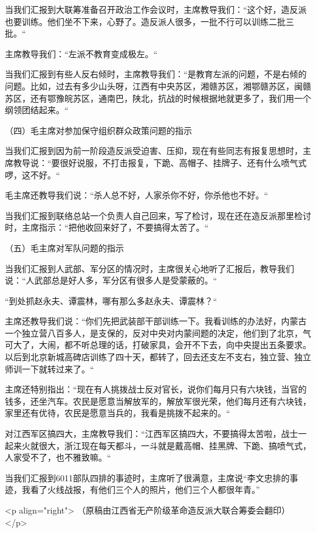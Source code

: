 当我们汇报到大联筹准备召开政治工作会议时，主席教导我们：“这个好，造反派也要训练。他们坐不下来，心野了。造反派人很多，一批不行可以训练二批三批。“

主席教导我们：“左派不教育变成极左。“

当我们汇报到有些人反右倾时，主席教导我们：“是教育左派的问题，不是右倾的问题。比如，过去有多少山头呀，江西有中央苏区，湘赣苏区，湘鄂赣苏区，闽赣苏区，还有鄂豫皖苏区，通南巴，陕北，抗战的时候根据地就更多了，我们用一个纲领团结起来。“

（四）毛主席对参加保守组织群众政策问题的指示

当我们汇报到因为前一阶段造反派受迫害、压抑，现在有些同志有报复思想时，主席教导说：“要很好说服，不打击报复，下跪、高帽子、挂牌子、还有什么喷气式啰，这不好。“

毛主席还教导我们说：“杀人总不好，人家杀你不好，你杀他也不好。“

当我们汇报到联络总站一个负责人自己回来，写了检讨，现在还在造反派那里检讨时，主席指示：“把他收回来好了，不要搞得太苦了。“

（五）毛主席对军队问题的指示

当我们汇报到人武部、军分区的情况时，主席很关心地听了汇报后，教导我们说：“人武部总是好人多，军分区有很多人是受蒙蔽的。“

“到处抓赵永夫、谭震林，哪有那么多赵永夫、谭震林？“

主席还教导我们说：“你们先把武装部干部训练一下。我看训练的办法好，内蒙古一个独立营八百多人，是支保的，反对中央对内蒙间题的决定，他们到了北京，气可大了，大闹，都不听总理的话，打破家具，会开不下去，向中央提出五条要求。以后到北京新城高碑店训练了四十天，都转了，回去还支左不支右，独立营、独立师训一下就转过来了。“

主席还特别指出：“现在有人挑拨战士反对官长，说你们每月只有六块钱，当官的钱多，还坐汽车。农民是愿意当解放军的，解放军很光荣，他们每月还有六块钱，家里还有优待，农民是愿意当兵的，我看是挑拨不起来的。“

对江西军区搞四大，主席教导我们：“江西军区搞四大，不要搞得太苦啦，战士一起来火就很大，浙江现在每天都斗，一斗就是戴高帽、挂黑牌、下跪、搞喷气式，人家受不了，也不雅致嘛。“

   当我们汇报到6011部队四排的事迹时，主席听了很满意，主席说“李文忠排的事迹，我看了火线战报，有他们三个人的照片，他们三个人都很年青。”

<p align="right">         （原稿由江西省无产阶级革命造反派大联合筹委会翻印）</p>


